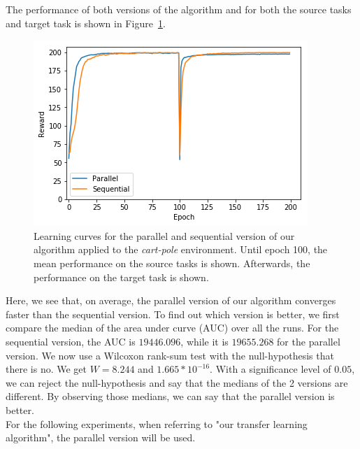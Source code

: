 The performance of both versions of the algorithm and for both the source tasks and target task is shown in Figure~\ref{fig:CartPole:reward_akt-kt_all_5tasks}.
\begin{figure}[htb]
    \centering
    \includegraphics[width=.8\linewidth]{images/results/CartPole/kt_akt/reward_source-target_5tasks.png}
    \caption[Learning curves for the parallel and sequential version of our algorithm applied to the \textit{cart-pole} environment]{Learning curves for the parallel and sequential version of our algorithm applied to the \textit{cart-pole} environment. Until epoch 100, the mean performance on the source tasks is shown. Afterwards, the performance on the target task is shown.}
    \label{fig:CartPole:reward_akt-kt_all_5tasks}
\end{figure}
Here, we see that, on average, the parallel version of our algorithm converges faster than the sequential version.
To find out which version is better, we first compare the median of the area under curve (AUC) over all the runs.
For the sequential version, the AUC is $19446.096$, while it is $19655.268$ for the parallel version.
We now use a Wilcoxon rank-sum test with the null-hypothesis that there is no.
We get $W=8.244$ and $1.665*10^{-16}$.
With a significance level of $0.05$, we can reject the null-hypothesis and say that the medians of the 2 versions are different.
By observing those medians, we can say that the parallel version is better.\\
For the following experiments, when referring to "our transfer learning algorithm", the parallel version will be used.

